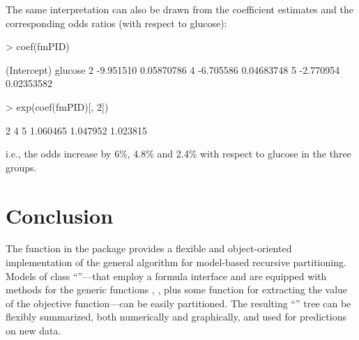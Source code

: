 \documentclass{Z}
\begin{document}
The same interpretation can also be drawn from the coefficient estimates
and the corresponding odds ratios (with respect to glucose):

\begin{Schunk}
\begin{Sinput}
> coef(fmPID)
\end{Sinput}
\begin{Soutput}
  (Intercept)    glucose
2   -9.951510 0.05870786
4   -6.705586 0.04683748
5   -2.770954 0.02353582
\end{Soutput}
\begin{Sinput}
> exp(coef(fmPID)[, 2])
\end{Sinput}
\begin{Soutput}
       2        4        5 
1.060465 1.047952 1.023815 
\end{Soutput}
\end{Schunk}


i.e., the odds increase by 6\%, 4.8\% and 2.4\%
with respect to glucose in the three groups.



\section{Conclusion}
\label{sec:conclusion}

The function  in the  package provides a flexible and object-oriented
implementation of the general algorithm for model-based recursive partitioning.
Models of class ``''---that employ a formula interface and are equipped with
methods for the generic functions , ,  plus
some function for extracting the value of the objective function---can be easily partitioned.
The resulting ``'' tree can be flexibly summarized, both numerically and graphically,
and used for predictions on new data.



\end{document}
